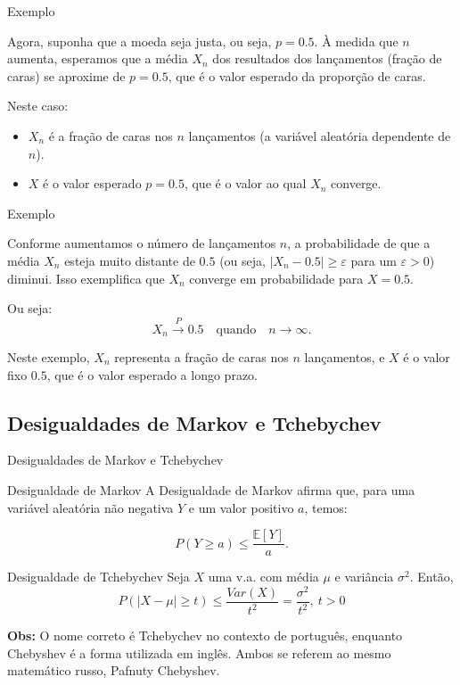 \documentclass[12pt]{beamer}
\begin{document}
\begin{frame}{Exemplo}
	\begin{block}{}
Agora, suponha que a moeda seja justa, ou seja, \( p = 0.5 \). À medida que \( n \) aumenta, esperamos que a média \( X_n \) dos resultados dos lançamentos (fração de caras) se aproxime de \( p = 0.5 \), que é o valor esperado da proporção de caras.

Neste caso:
\begin{itemize}
	\item \( X_n \) é a fração de caras nos \( n \) lançamentos (a variável aleatória dependente de \( n \)).
	\item \( X \) é o valor esperado \( p = 0.5 \), que é o valor ao qual \( X_n \) converge.
\end{itemize}		
	\end{block}
\end{frame}

\begin{frame}{Exemplo}
	\begin{block}{}
Conforme aumentamos o número de lançamentos \( n \), a probabilidade de que a média \( X_n \) esteja muito distante de \( 0.5 \) (ou seja, \( |X_n - 0.5| \geq \varepsilon \) para um \( \varepsilon > 0 \)) diminui. Isso exemplifica que \( X_n \) converge em probabilidade para \( X = 0.5 \).

Ou seja:
\[
X_n \xrightarrow{P} 0.5 \quad \text{quando} \quad n \to \infty.
\]

Neste exemplo, \( X_n \) representa a fração de caras nos \( n \) lançamentos, e \( X \) é o valor fixo \( 0.5 \), que é o valor esperado a longo prazo.
	\end{block}
\end{frame}


\subsection{Desigualdades de Markov e Tchebychev}
\begin{frame}{Desigualdades de Markov e Tchebychev}
	\vspace{-0.2cm}
	\begin{block}{Desigualdade de Markov}
		\justifying
		A Desigualdade de Markov afirma que, para uma variável aleatória não negativa $Y$ e um valor positivo $a$, temos:

		$$P(Y \geq a) \leq \frac{\mathbb{E}[Y]}{a}.$$
	\end{block}
	\pause
		\vspace{-0.2cm}
\begin{block}{Desigualdade de Tchebychev}
\justifying
Seja $X$ uma v.a. com média $\mu$ e variância $\sigma^{2}.$ Então,
$$P(|X-\mu|\geq t)\leq \dfrac{Var(X)}{t^{2}}=\dfrac{\sigma^{2}}{t^{2}},~t>0$$
\end{block}
\pause
\begin{block}{}
	\justifying
\textbf{Obs:} O nome correto é Tchebychev no contexto de português, enquanto Chebyshev é a forma utilizada em inglês. Ambos se referem ao mesmo matemático russo, Pafnuty Chebyshev. 

\end{block}
\end{frame}
\end{document}
